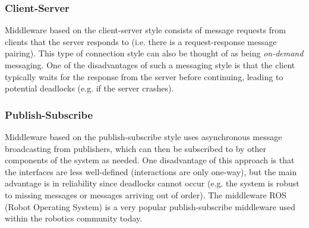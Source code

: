 \subsubsection{Client-Server}
Middleware based on the client-server style consists of message requests from clients that the server responds to (i.e. there is a request-response message pairing). This type of connection style can also be thought of as being \textit{on-demand} messaging. One of the disadvantages of such a messaging style is that the client typically waits for the response from the server before continuing, leading to potential deadlocks (e.g. if the server crashes).

\subsubsection{Publish-Subscribe}
Middleware based on the publish-subscribe style uses asynchronous message broadcasting from publishers, which can then be subscribed to by other components of the system as needed. One disadvantage of this approach is that the interfaces are less well-defined (interactions are only one-way), but the main advantage is in reliability since deadlocks cannot occur (e.g. the system is robust to missing messages or messages arriving out of order).
The middleware ROS (Robot Operating System) is a very popular publish-subscribe middleware used within the robotics community today.




